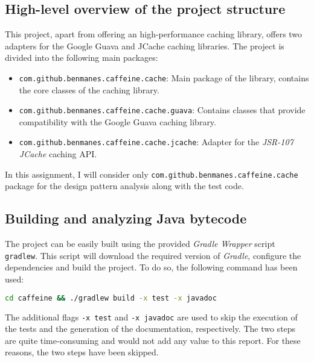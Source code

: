 \subsection{High-level overview of the project structure}

This project, apart from offering an high-performance caching library, offers two adapters for the Google Guava and JCache caching libraries. The project is divided into the following main packages:

\begin{itemize}
	\item \texttt{com.github.benmanes.caffeine.cache}: Main package of the library, contains the core classes of the caching library.
  \item \texttt{com.github.benmanes.caffeine.cache.guava}: Contains classes that provide compatibility with the Google Guava caching library. \cite{caffeine:guava}
  \item \texttt{com.github.benmanes.caffeine.cache.jcache}: Adapter for the \textit{JSR-107 JCache} caching API. \cite{caffeine:jcache}
\end{itemize}

In this assignment, I will consider only \texttt{com.github.benmanes.caffeine.cache} package for the design pattern analysis along with the test code.

\subsection{Building and analyzing Java bytecode}
\label{sec:building}

The project can be easily built using the provided \textit{Gradle Wrapper} script \texttt{gradlew}. This script will download the required version of \textit{Gradle}, configure the dependencies and build the project. To do so, the following command has been used:

\begin{lstlisting}[language=bash, caption={Building the Caffeine project with Gradle}]
              cd caffeine && ./gradlew build -x test -x javadoc
\end{lstlisting}

\noindent The additional flags \texttt{-x test} and \texttt{-x javadoc} are used to skip the execution of the tests and the generation of the documentation, respectively. The two steps are quite time-consuming and would not add any value to this report. For these reasons, the two steps have been skipped.

